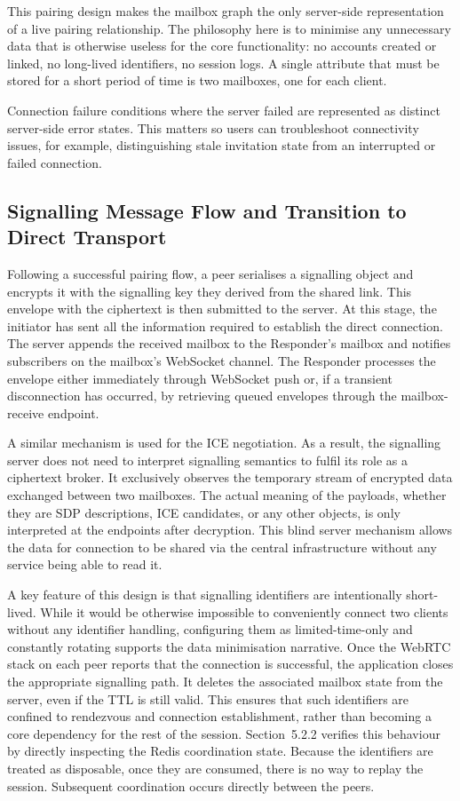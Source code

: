 \documentclass[12pt,a4paper,oneside]{report}
\begin{document}
This pairing design makes the mailbox graph the only server-side representation of a live pairing relationship. The philosophy here is to minimise any unnecessary data that is otherwise useless for the core functionality: no accounts created or linked, no long-lived identifiers, no session logs. A single attribute that must be stored for a short period of time is two mailboxes, one for each client.

Connection failure conditions where the server failed are represented as distinct server-side error states. This matters so users can troubleshoot connectivity issues, for example, distinguishing stale invitation state from an interrupted or failed connection.


\subsection{Signalling Message Flow and Transition to Direct Transport}
\label{sec:signalling-flow}

Following a successful pairing flow, a peer serialises a signalling object and encrypts it with the signalling key they derived from the shared link. This envelope with the ciphertext is then submitted to the server. At this stage, the initiator has sent all the information required to establish the direct connection. The server appends the received mailbox to the Responder's mailbox and notifies subscribers on the mailbox's WebSocket channel. The Responder processes the envelope either immediately through WebSocket push or, if a transient disconnection has occurred, by retrieving queued envelopes through the mailbox-receive endpoint.

A similar mechanism is used for the ICE negotiation. As a result, the signalling server does not need to interpret signalling semantics to fulfil its role as a ciphertext broker. It exclusively observes the temporary stream of encrypted data exchanged between two mailboxes. The actual meaning of the payloads, whether they are SDP descriptions, ICE candidates, or any other objects, is only interpreted at the endpoints after decryption. This blind server mechanism allows the data for connection to be shared via the central infrastructure without any service being able to read it.

A key feature of this design is that signalling identifiers are intentionally short-lived. While it would be otherwise impossible to conveniently connect two clients without any identifier handling, configuring them as limited-time-only and constantly rotating supports the data minimisation narrative. Once the WebRTC stack on each peer reports that the connection is successful, the application closes the appropriate signalling path. It deletes the associated mailbox state from the server, even if the TTL is still valid. This ensures that such identifiers are confined to rendezvous and connection establishment, rather than becoming a core dependency for the rest of the session. Section~5.2.2 verifies this behaviour by directly inspecting the Redis coordination state. Because the identifiers are treated as disposable, once they are consumed, there is no way to replay the session. Subsequent coordination occurs directly between the peers.
\end{document}
